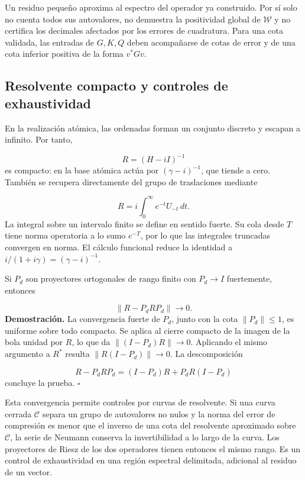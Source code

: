 Un residuo pequeño aproxima al espectro del operador ya construido. Por sí solo no cuenta todos sus autovalores, no demuestra la positividad global de \(\mathscr W\) y no certifica los decimales afectados por los errores de cuadratura. Para una cota validada, las entradas de \(G,K,Q\) deben acompañarse de cotas de error y de una cota inferior positiva de la forma \(v^*Gv\).

\subsection{Resolvente compacto y controles de exhaustividad}
\label{rz:resolvente}
En la realización atómica, las ordenadas forman un conjunto discreto y escapan a infinito. Por tanto,

\[
R=(H-iI)^{-1}
\]
es compacto: en la base atómica actúa por \((\gamma-i)^{-1}\), que tiende a cero. También se recupera directamente del grupo de traslaciones mediante

\[
R=i\int_0^\infty e^{-t}U_{-t}\,dt.
\]
La integral sobre un intervalo finito se define en sentido fuerte. Su cola desde \(T\) tiene norma operatoria a lo sumo \(e^{-T}\), por lo que las integrales truncadas convergen en norma. El cálculo funcional reduce la identidad a \(i/(1+i\gamma)=(\gamma-i)^{-1}\).

Si \(P_d\) son proyectores ortogonales de rango finito con \(P_d\to I\) fuertemente, entonces

\[
\|R-P_dRP_d\|\longrightarrow0.
\]
\textbf{Demostración.} La convergencia fuerte de \(P_d\), junto con la cota \(\|P_d\|\leq1\), es uniforme sobre todo compacto. Se aplica al cierre compacto de la imagen de la bola unidad por \(R\), lo que da \(\|(I-P_d)R\|\to0\). Aplicando el mismo argumento a \(R^*\) resulta \(\|R(I-P_d)\|\to0\). La descomposición

\[
R-P_dRP_d=(I-P_d)R+P_dR(I-P_d)
\]
concluye la prueba. \hfill\(\square\)

Esta convergencia permite controles por curvas de resolvente. Si una curva cerrada \(\mathcal C\) separa un grupo de autovalores no nulos y la norma del error de compresión es menor que el inverso de una cota del resolvente aproximado sobre \(\mathcal C\), la serie de Neumann conserva la invertibilidad a lo largo de la curva. Los proyectores de Riesz de los dos operadores tienen entonces el mismo rango. Es un control de exhaustividad en una región espectral delimitada, adicional al residuo de un vector.

